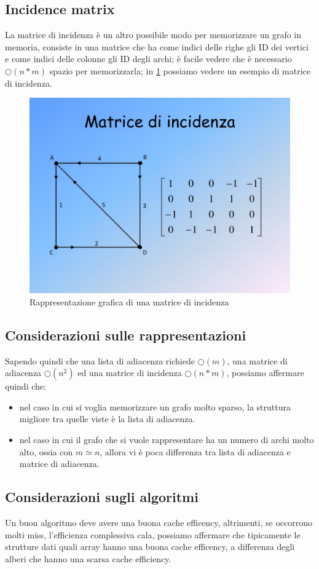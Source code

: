 \documentclass[12pt,a4paper]{article}
\begin{document}
\subsection{Incidence matrix}
La matrice di incidenza è un altro possibile modo per memorizzare un grafo in memoria, consiste in una matrice che ha come indici delle righe gli ID dei vertici e come indici delle colonne gli ID degli archi; è facile vedere che è necessario $\bigcirc(n * m)$ spazio per memorizzarla; in \ref{fig:4} possiamo vedere un esempio di matrice di incidenza.
\begin{figure}[h]
	\centering
	\includegraphics[width=0.7\linewidth]{img/matrice_incidenza.jpeg}
	\caption{Rappresentazione grafica di una matrice di incidenza}
	\label{fig:4}
\end{figure}

\subsection{Considerazioni sulle rappresentazioni}
Sapendo quindi che una lista di adiacenza richiede $\bigcirc(m)$, una matrice di adiacenza $\bigcirc(n^{2})$ ed una matrice di incidenza $\bigcirc(n * m)$, possiamo affermare quindi che:
\begin{itemize}
\item nel caso in cui si voglia memorizzare un grafo molto sparso, la struttura migliore tra quelle viste è la lista di adiacenza.
\item nel caso in cui il grafo che si vuole rappresentare ha un numero di archi molto alto, ossia con $m \simeq n$, allora vi è poca differenza tra lista di adiacenza e matrice di adiacenza.
\end{itemize}

\subsection{Considerazioni sugli algoritmi}
Un buon algoritmo deve avere una buona cache efficency, altrimenti, se occorrono molti miss, l'efficienza complessiva cala, possiamo affermare che tipicamente le strutture dati quali array hanno una buona cache efficency, a differenza degli alberi che hanno una scarsa cache efficiency.
\end{document}
